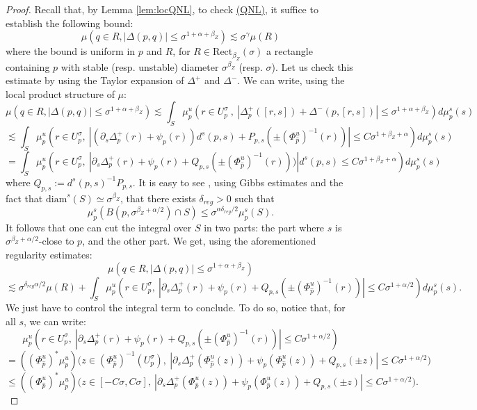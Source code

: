 \documentclass[a4paper]{article}
\theoremstyle{definition}
\begin{document}
\begin{proof}
Recall that, by Lemma \ref{lem:locQNL}, to check \hyperref[QNL]{(QNL)}, it suffice to establish the following bound:
$$ \mu \left( q \in R, |\Delta(p,q)| \leq \sigma^{1+\alpha+\beta_Z} \right) \lesssim \sigma^\gamma \mu(R) $$
where the bound is uniform in $p$ and $R$, for $R \in \text{Rect}_{\beta_Z}(\sigma)$ a rectangle containing $p$ with stable (resp. unstable) diameter $\sigma^{\beta_Z}$ (resp. $\sigma$). Let us check this estimate by using the Taylor expansion of $\Delta^+$ and $\Delta^-$. We can write, using the local product structure of $\mu$:
$$ \mu \left( q \in R, |\Delta(p,q)| \leq \sigma^{1+\alpha+\beta_Z} \right) \lesssim \int_{S} \mu_p^u \left( r \in U_p^\sigma \ , \ |\Delta_p^+([r,s]) + \Delta^-(p,[r,s])| \leq \sigma^{1+\alpha+\beta_Z}  \right) d\mu_p^s(s)  $$
$$ \lesssim \int_{S} \mu_p^u\left( r \in U_p^\sigma , \ |(\partial_s \Delta_p^+(r) + \psi_p(r)) d^s(p,s) + P_{p,s}(\pm (\Phi_{\widehat{p}}^u)^{-1}(r))| \leq C \sigma^{1+\beta_Z+\alpha} \right) d\mu_p^s(s) $$
$$ = \int_{S} \mu_p^u\left( r \in U_p^\sigma , \ |\partial_s \Delta_p^+(r) + \psi_p(r) + Q_{p,s}(\pm (\Phi_{\widehat{p}}^u)^{-1}(r)))| d^s(p,s) \leq C \sigma^{1+\beta_Z+\alpha} \right) d\mu_p^s(s) $$
where $Q_{p,s} := {d^s(p,s)}^{-1} {P_{p,s}}$. It is easy to see \cite{Le24}, using Gibbs estimates and the fact that $\text{diam}^s(S) \simeq \sigma^{\beta_Z}$, that there exists $\delta_{reg}>0$ such that $$\mu_p^s( B(p,\sigma^{\beta_Z+\alpha/2}) \cap S ) \leq \sigma^{\alpha \delta_{reg}/2} \mu_p^s(S) .$$
It follows that one can cut the integral over $S$ in two parts: the part where $s$ is $\sigma^{\beta_Z+\alpha/2}$-close to $p$, and the other part. We get, using the aforementioned regularity estimates:
$$ \mu \left( q \in R, |\Delta(p,q)|\leq \sigma^{1+\alpha+\beta_Z} \right) $$ $$ \lesssim \sigma^{\delta_{reg} \alpha/2} \mu(R) + \int_{S} \mu_p^u\left( r \in U_p^\sigma , \ |\partial_s \Delta_p^+(r) + \psi_p(r) + Q_{p,s}(\pm (\Phi_{\widehat{p}}^u)^{-1}(r))| \leq C \sigma^{1+\alpha/2} \right) d\mu_p^s(s). $$
We just have to control the integral term to conclude. To do so, notice that, for all $s$, we can write:
$$ \mu_p^u\left( r \in U_p^\sigma , \ |\partial_s \Delta_p^+(r) + \psi_p(r) + Q_{p,s}(\pm (\Phi_{\widehat{p}}^u)^{-1}(r))| \leq C \sigma^{1+\alpha/2} \right)  $$ $$= \left((\Phi_{\widehat{p}}^u)^*\mu_p^u \right)\Big( z \in (\Phi_{\widehat{p}}^u)^{-1}(U_p^\sigma), \ |\partial_s \Delta_p^+( \Phi_{\widehat{p}}^u(z) ) + \psi_p( \Phi_{\widehat{p}}^u(z) ) + Q_{p,s}(\pm z) | \leq  C \sigma^{1+\alpha/2} \Big) $$
$$ \leq \left((\Phi_{\widehat{p}}^u)^*\mu_p^u \right)\Big( z \in [-C \sigma,C \sigma], \ |\partial_s \Delta_p^+(\Phi_{\widehat{p}}^u(z)) + \psi_p(\Phi_{\widehat{p}}^u(z)) + Q_{p,s}(\pm z)| \leq C \sigma^{1+\alpha/2} \Big) . $$

\end{proof}
\end{document}
